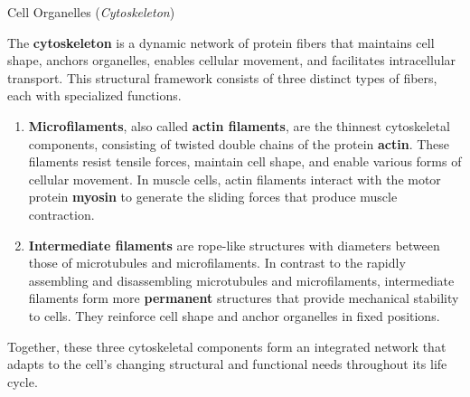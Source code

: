 \documentclass[10pt]{article}
\begin{document}
    \begin{core}[label=core:cyto]{Cell Organelles (\textit{Cytoskeleton})}

      The \textbf{cytoskeleton} is a dynamic network of protein fibers that maintains cell shape, anchors organelles, enables cellular movement, and facilitates intracellular transport. This structural framework consists of three distinct types of fibers, each with specialized functions.

      \begin{enumerate}


        \item \textbf{Microfilaments}, also called \textbf{actin filaments}, are the thinnest cytoskeletal components, consisting of twisted double chains of the protein \textbf{actin}. These filaments resist tensile forces, maintain cell shape, and enable various forms of cellular movement. In muscle cells, actin filaments interact with the motor protein \textbf{myosin} to generate the sliding forces that produce muscle contraction.


        \item \textbf{Intermediate filaments} are rope-like structures with diameters between those of microtubules and microfilaments. In contrast to the rapidly assembling and disassembling microtubules and microfilaments, intermediate filaments form more \textbf{permanent} structures that provide mechanical stability to cells. They reinforce cell shape and anchor organelles in fixed positions.


      \end{enumerate}

      Together, these three cytoskeletal components form an integrated network that adapts to the cell's changing structural and functional needs throughout its life cycle.

    \end{core}
\end{document}
